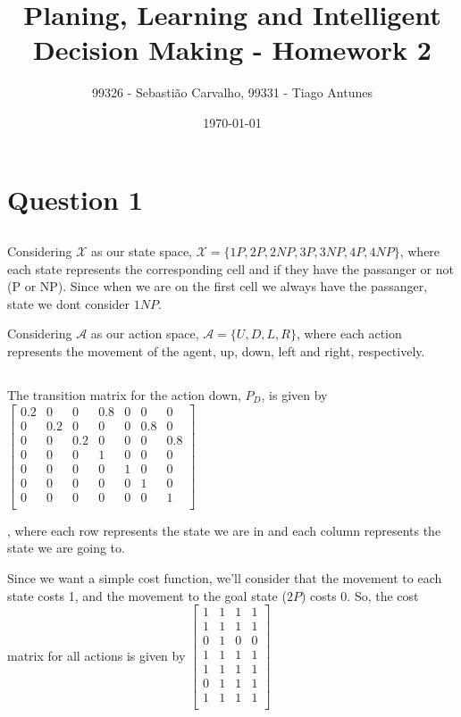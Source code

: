 \documentclass{article}
\title{Planing, Learning and Intelligent Decision Making - Homework 2}
\author{99326 - Sebastião Carvalho, 99331 - Tiago Antunes}
\date{\today}
\begin{document}
\maketitle

\tableofcontents

\section{Question 1}

\subsection{}

Considering $\mathcal{X}$ as our state space, $\mathcal{X} = \{1P, 2P, 2NP, 3P, 3NP, 4P, 4NP\}$, 
where each state represents the corresponding cell and if they have the passanger or not (P or NP). 
Since when we are on the first cell we always have the passanger, state we dont consider $1NP$.

Considering $\mathcal{A}$ as our action space, $\mathcal{A} = \{U, D, L, R\}$, 
where each action represents the movement of the agent, up, down, left and right, respectively.

\subsection{}

The transition matrix for the action down, $P_D$, is given by
$\begin{bmatrix}
    0.2 & 0 & 0 & 0.8 & 0 & 0 & 0 \\
    0 & 0.2 & 0 & 0 & 0 & 0.8 & 0 \\
    0 & 0 & 0.2 & 0 & 0 & 0 & 0.8 \\
    0 & 0 & 0 & 1 & 0 & 0 & 0 \\
    0 & 0 & 0 & 0 & 1 & 0 & 0 \\
    0 & 0 & 0 & 0 & 0 & 1 & 0 \\
    0 & 0 & 0 & 0 & 0 & 0 & 1 \\
\end{bmatrix}$

\medskip

, where each row represents the state we are in and each column represents the state we are going to.

\bigskip

Since we want a simple cost function, we'll consider that the movement to each state costs 1,
and the movement to the goal state ($2P$) costs 0. So, the cost matrix for all actions is given by
$\begin{bmatrix}
    1 & 1 & 1 & 1 \\
    1 & 1 & 1 & 1 \\
    0 & 1 & 0 & 0 \\
    1 & 1 & 1 & 1 \\
    1 & 1 & 1 & 1 \\
    0 & 1 & 1 & 1 \\
    1 & 1 & 1 & 1 \\
\end{bmatrix}$
\end{document}
